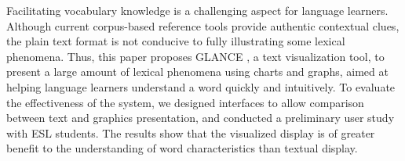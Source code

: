 Facilitating vocabulary knowledge is a challenging aspect for language learners. Although current corpus-based reference tools provide authentic contextual clues, the plain text format is not conducive to fully illustrating some lexical phenomena. Thus, this paper proposes GLANCE , a text visualization tool, to present a large amount of lexical phenomena using charts and graphs, aimed at helping language learners understand a word quickly and intuitively. To evaluate the effectiveness of the system, we designed interfaces to allow comparison between text and graphics presentation, and conducted a preliminary user study with ESL students. The results show that the visualized display is of greater benefit to the understanding of word characteristics than textual display.
